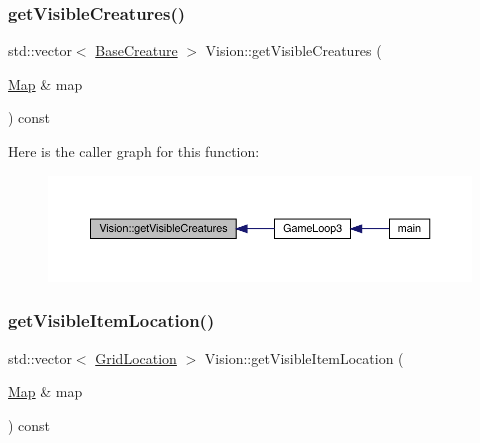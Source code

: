 \mbox{\label{class_vision_ad8806902c3144f15827fd93c1aabfa06}} 
\subsubsection{\texorpdfstring{get\+Visible\+Creatures()}{getVisibleCreatures()}}
{\footnotesize\ttfamily std\+::vector$<$ \mbox{\hyperlink{class_base_creature}{Base\+Creature}} $>$ Vision\+::get\+Visible\+Creatures (\begin{DoxyParamCaption}\item[{\mbox{\hyperlink{class_map}{Map}} \&}]{map }\end{DoxyParamCaption}) const}

Here is the caller graph for this function\+:
\nopagebreak
\begin{figure}[H]
\begin{center}
\leavevmode
\includegraphics[width=350pt]{class_vision_ad8806902c3144f15827fd93c1aabfa06_icgraph}
\end{center}
\end{figure}
\mbox{\label{class_vision_aaada841a563a60650e2261796ff18713}} 
\subsubsection{\texorpdfstring{get\+Visible\+Item\+Location()}{getVisibleItemLocation()}}
{\footnotesize\ttfamily std\+::vector$<$ \mbox{\hyperlink{struct_grid_location}{Grid\+Location}} $>$ Vision\+::get\+Visible\+Item\+Location (\begin{DoxyParamCaption}\item[{\mbox{\hyperlink{class_map}{Map}} \&}]{map }\end{DoxyParamCaption}) const}

\mbox{\label{class_vision_a57e240a165d83bd1869e4053af0a4569}} 
